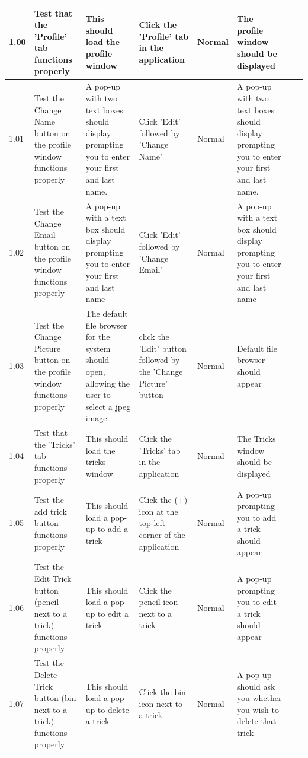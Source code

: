 \begin{landscape}
\begin{center}
\begin{longtable}{|p{1.5cm}|p{2.5cm}|p{2.5cm}|p{2cm}|p{2cm}|p{2cm}|p{2cm}|p{2cm}|}
1.00 & Test that the 'Profile' tab functions properly & This should load the profile window & Click the 'Profile' tab in the application & Normal & The profile window should be displayed & &  \\ \hline

1.01 & Test the Change Name button on the profile window functions properly & A pop-up with two text boxes should display prompting you to enter your first and last name. &  Click 'Edit' followed by 'Change Name'  & Normal & A pop-up with two text boxes should display prompting you to enter your first and last name. & & \\ \hline

1.02 & Test the Change Email button on the profile window functions properly & A pop-up with a text box should display prompting you to enter your first and last name & Click 'Edit' followed by 'Change Email' & Normal &  A pop-up with a text box should display prompting you to enter your first and last name & &  \\ \hline

1.03 & Test the Change Picture button on the profile window functions properly &  The default file browser for the system should open, allowing the user to select a jpeg image & click the 'Edit' button followed by the 'Change Picture' button & Normal & Default file browser should appear & &\\ \hline



1.04 & Test that the 'Tricks' tab functions properly & This should load the tricks window & Click the 'Tricks' tab in the application & Normal & The Tricks window should be displayed & & \\ \hline

1.05 & Test the add trick button functions properly & This should load a pop-up to add a trick & Click the (+) icon at the top left corner of the application & Normal & A pop-up prompting you to add a trick should appear &  \\ \hline

1.06 & Test the Edit Trick button (pencil next to a trick) functions properly & This should load a pop-up to edit a trick & Click the pencil icon next to a trick & Normal & A pop-up prompting you to edit a trick should appear &  \\ \hline

1.07 & Test the Delete Trick button (bin next to a trick) functions properly & This should load a pop-up to delete a trick & Click the bin icon next to a trick & Normal & A pop-up should ask you whether you wish to delete that trick &  \\ \hline




\end{longtable}
\end{center}
\end{landscape}

